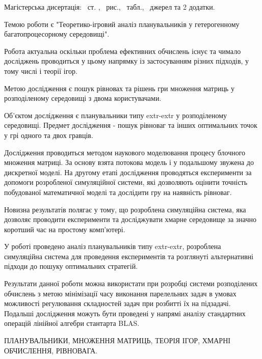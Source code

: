 
Магістерська дисертація: \pageref*{MyLastPage}~ст. , \totfig~рис.,  \tottab~табл., ~джерел та 2 додатки.

Темою роботи є "Теоретико-ігровий аналіз планувальників у гетерогенному багатопроцесорному середовищі".

Робота актуальна оскільки проблема ефективних обчислень існує та чимало досліджень проводиться у цьому напрямку із застосуванням різних підходів, у тому числі і теорії ігор.

Метою дослідження є пошук рівновах та рішень гри множення матриць у розподіленому середовищі з двома користувачами.

Об'єктом дослідження є планувальники типу extr-extr у розподіленому середовищі. Предмет дослідження - пошук рівноваг та інших оптимальних точок у грі одного та двох гравців.

Дослідження проводиться методом наукового моделювання процесу блочного множення матриці. За основу взята потокова модель і у подальшому звужена до дискретної моделі. На другому етапі дослідження проводяться експерименти за допомоги розробленої симуляційної системи, які дозволяють оцінити точність побудованої математичної моделі та дослідити гру на наявність рівноваг.

Новизна результатів полягає у тому, що розроблена симуляційна система, яка дозволяє проводити експерименти та досліджувати хмарне середовище за значно коротший час на простому комп'ютері.

У роботі проведено аналіз планувальників типу extr-extr, розроблена симуляційна система для проведення експериментів та розглянуті альтернативні підходи до пошуку оптимальних стратегій.

Результати данної роботи можна використати при розробці системи розподілених обчислень з метою мінімізації часу виконання парелельних задач в умовах можливості регулювання складностей задач при розбитті їх на підзадачі. Подальші дослідження можуть бути проведені у напрямі аналізу стандартних операцій лінійної алгебри стантарта BLAS.

\MakeUppercase{планувальники, множення матриць, теорія ігор, хмарні обчислення, рівновага.}